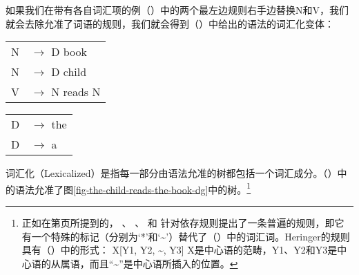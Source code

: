 \z
如果我们在带有各自词汇项的例（）中的两个最左边规则右手边替换N和V，我们就会去除允准了词语的规则，我们就会得到（）中给出的语法的词汇化变体：
\ea
\begin{tabular}[t]{@{}l@{ }l}
{N} & {$\to$ D book}\\          
{N} & {$\to$ D child}\\          
{V}  & {$\to$ N reads N}
\end{tabular}\hspace{1.5cm}%
\begin{tabular}[t]{@{}l@{ }l}
{D}  & {$\to$ the}\\
{D}  & {$\to$ a}\\
\end{tabular}
\z
词汇化（Lexicalized）是指每一部分由语法允准的树都包括一个词汇成分。（）中的语法允准了图\ref{fig-the-child-reads-the-book-dg}中的树。\footnote{\label{fn-flat-dg-rules}%
正如在第\pageref{page-rule-format-dg}页所提到的， \citet[]{Gaifman65a}、 \citet[]{Hays64a-u}、 \citet[]{Baumgaertner70a}和 \citet[]{Heringer96a-u}针对依存规则提出了一条普遍的规则，即它有一个特殊的标记（分别为`*'和`\textasciitilde'）替代了（）中的词汇词。Heringer的规则具有（）中的形式：
\ea
X[Y1, Y2, \textasciitilde, Y3]
\z
X是中心语的范畴，Y1、Y2和Y3是中心语的从属语，而且“\textasciitilde”是中心语所插入的位置。
}

